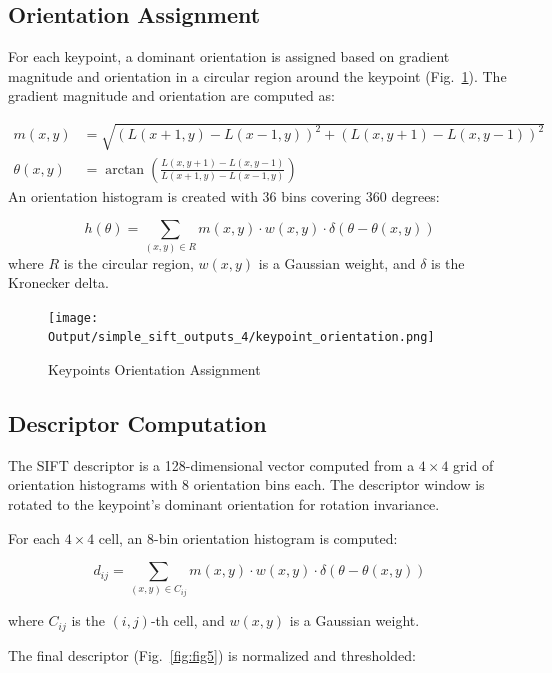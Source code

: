 \documentclass[12pt,a4paper]{article}
\begin{document}
\subsection{Orientation Assignment}

For each keypoint, a dominant orientation is assigned based on gradient magnitude and orientation in a circular region around the keypoint (Fig.~\ref{fig:fig4}). The gradient magnitude and orientation are computed as:

\begin{align}
m(x,y) &= \sqrt{(L(x+1,y) - L(x-1,y))^2 + (L(x,y+1) - L(x,y-1))^2} \\
\theta(x,y) &= \arctan\left(\frac{L(x,y+1) - L(x,y-1)}{L(x+1,y) - L(x-1,y)}\right)
\end{align}
An orientation histogram is created with 36 bins covering 360 degrees:

\begin{equation}
h(\theta) = \sum_{(x,y) \in R} m(x,y) \cdot w(x,y) \cdot \delta(\theta - \theta(x,y))
\end{equation}
where $R$ is the circular region, $w(x,y)$ is a Gaussian weight, and $\delta$ is the Kronecker delta.

\begin{figure}[!ht]
    \centering
    \texttt{[image: Output/simple\_sift\_outputs\_4/keypoint\_orientation.png]}
    \caption{Keypoints Orientation Assignment}
    \label{fig:fig4}
\end{figure}


\subsection{Descriptor Computation}

The SIFT descriptor is a 128-dimensional vector computed from a $4 \times 4$ grid of orientation histograms with 8 orientation bins each. The descriptor window is rotated to the keypoint's dominant orientation for rotation invariance.

For each $4 \times 4$ cell, an 8-bin orientation histogram is computed:

\begin{equation}
d_{ij} = \sum_{(x,y) \in C_{ij}} m(x,y) \cdot w(x,y) \cdot \delta(\theta - \theta(x,y))
\end{equation}

where $C_{ij}$ is the $(i,j)$-th cell, and $w(x,y)$ is a Gaussian weight.

The final descriptor (Fig.~\ref{fig:fig5}) is normalized and thresholded:
\end{document}
